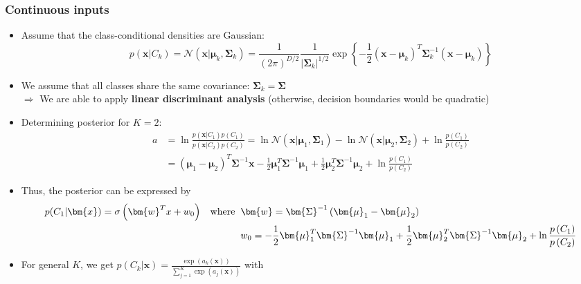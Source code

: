 \subsubsection{Continuous inputs}
\begin{itemize}
	\item Assume that the class-conditional  densities are Gaussian:
	$$p\left(\bm{x}|C_k\right) = \mathcal{N}\left(\bm{x}|\bm{\mu}_k,\bm{\Sigma}_k\right) = \frac{1}{\left(2\pi\right)^{D/2}}\frac{1}{|\bm{\Sigma}_k|^{1/2}}\exp\left\{-\frac{1}{2}\left(\bm{x}-\bm{\mu}_k\right)^T\bm{\Sigma}^{-1}_k\left(\bm{x}-\bm{\mu}_k\right)\right\}$$
	\item We assume that all classes share the same covariance: $\bm{\Sigma}_k = \bm{\Sigma}$\\$\Rightarrow$ We are able to apply \textbf{linear discriminant analysis} (otherwise, decision boundaries would be quadratic)
	\item Determining posterior for $K=2$:
	\begin{equation*}
		\begin{split}
			a & = \ln \frac{p\left(\bm{x}|C_1\right)p\left(C_1\right)}{p\left(\bm{x}|C_2\right)p\left(C_2\right)} = \ln \mathcal{N}\left(\bm{x}|\bm{\mu}_1,\bm{\Sigma}_1\right) - \ln \mathcal{N}\left(\bm{x}|\bm{\mu}_2,\bm{\Sigma}_2\right) + \ln \frac{p\left(C_1\right)}{p\left(C_2\right)}\\
			& = \left(\bm{\mu}_1 - \bm{\mu}_2\right)^T\bm{\Sigma}^{-1}\bm{x} - \frac{1}{2}\bm{\mu}_1^T\bm{\Sigma}^{-1}\bm{\mu}_1 + \frac{1}{2}\bm{\mu}_2^T\bm{\Sigma}^{-1}\bm{\mu}_2 + \ln \frac{p\left(C_1\right)}{p\left(C_2\right)}
		\end{split}
	\end{equation*}
	\item Thus, the posterior can be expressed by
	\begin{equation*}
		\begin{split}
			p(C_1|\bm{x})=\sigma\left(\bm{w}^Tx+w_0\right) \text{\hspace{3mm}where\hspace{2mm}} & \bm{w} = \bm{\Sigma}^{-1}\left(\bm{\mu}_1 - \bm{\mu}_2\right)\\
			& w_0 = -\frac{1}{2}\bm{\mu}_1^T\bm{\Sigma}^{-1}\bm{\mu}_1 + \frac{1}{2}\bm{\mu}_2^T\bm{\Sigma}^{-1}\bm{\mu}_2 + \ln \frac{p\left(C_1\right)}{p\left(C_2\right)}
		\end{split}
	\end{equation*} 
	\item For general $K$, we get $p\left(C_k|\bm{x}\right) = \frac{\exp\left(a_k\left(\bm{x}\right)\right)}{\sum_{j=1}^{K}\exp\left(a_j\left(\bm{x}\right)\right)}$ with 

\end{itemize}
